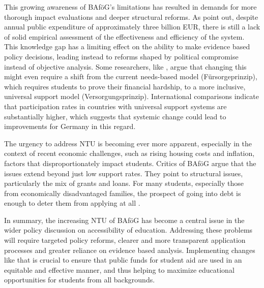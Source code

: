 This growing awareness of BAföG’s limitations has resulted in demands for more thorough impact evaluations and deeper structural reforms. As \citep{meier_bafog_2024} point out, despite annual public expenditure of approximately three billion EUR, there is still a lack of solid empirical assessment of the effectiveness and efficiency of the system. This knowledge gap has a limiting effect on the ability to make evidence based policy decisions, leading instead to reforms shaped by political compromise instead of objective analysis. Some researchers, like \citep{gwosc_krisenbewaltigung_2022}, argue that changing this might even require a shift from the current needs-based model (Fürsorgeprinzip), which requires students to prove their financial hardship, to a more inclusive, universal support model (Versorgungsprinzip). International comparisons indicate that participation rates in countries with universal support systems are substantially higher, which suggests that systemic change could lead to improvements for Germany in this regard.

The urgency to address NTU is becoming ever more apparent, especially in the context of recent economic challenges, such as rising housing costs and inflation, factors that disproportionately impact students. Critics of BAföG argue that the issues extend beyond just low support rates. They point to structural issues, particularly the mix of grants and loans. For many students, especially those from economically disadvantaged families, the prospect of going into debt is enough to deter them from applying at all \citep{staack_von_2017, gwosc_krisenbewaltigung_2022}.

In summary, the increasing NTU of BAföG has become a central issue in the wider policy discussion on accessibility of education. Addressing these problems will require targeted policy reforms, clearer and more transparent application processes and greater reliance on evidence based analysis. Implementing changes like that is crucial to ensure that public funds for student aid are used in an equitable and effective manner, and thus helping to maximize educational opportunities for students from all backgrounds.
